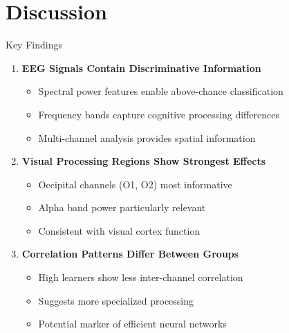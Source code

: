 \documentclass[aspectratio=169]{beamer}
\begin{document}
\section{Discussion}

\begin{frame}{Key Findings}
\begin{enumerate}
    \item \textbf{EEG Signals Contain Discriminative Information}
    \begin{itemize}
        \item Spectral power features enable above-chance classification
        \item Frequency bands capture cognitive processing differences
        \item Multi-channel analysis provides spatial information
    \end{itemize}
    
    \vspace{3mm}
    
    \item \textbf{Visual Processing Regions Show Strongest Effects}
    \begin{itemize}
        \item Occipital channels (O1, O2) most informative
        \item Alpha band power particularly relevant
        \item Consistent with visual cortex function
    \end{itemize}
    
    \vspace{3mm}
    
    \item \textbf{Correlation Patterns Differ Between Groups}
    \begin{itemize}
        \item High learners show less inter-channel correlation
        \item Suggests more specialized processing
        \item Potential marker of efficient neural networks
    \end{itemize}
\end{enumerate}
\end{frame}
\end{document}
